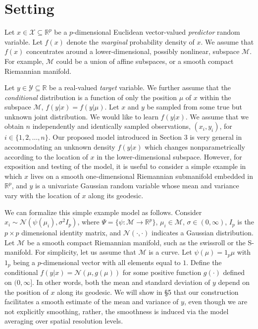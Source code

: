 \documentclass{article}
\newcommand{\Real}{\mathbb{R}}
\providecommand{\mc}[1]{\mathcal{#1}}
\newcommand{\from}{{\ensuremath{\colon}}}           %
\begin{document}
\section{Setting}
Let $x \in \mathcal{X} \subseteq \Real^p$ be a $p$-dimensional Euclidean vector-valued \emph{predictor} random variable.  Let $f(x)$ denote the \emph{marginal} probability density of $x$.  We assume that $f(x)$ concentrates around a lower-dimensional, possibly nonlinear, subspace $\mc{M}$.  For example, $\mc{M}$ could be a union of affine subspaces, or a smooth compact Riemannian manifold.  

Let $y \in  \mathcal{Y} \subseteq \Real$ be a real-valued \emph{target} variable. We further assume that the \emph{conditional} distribution is a function of only the position $\mu$ of $x$ within the subspace $\mathcal{M}$, $f(y|x)=f(y|\mu)$. Let $x$ and $y$ be sampled from some true but unknown joint distribution. We would like to learn $f(y| x)$.  We assume that we obtain $n$ independently and identically sampled observations, $(x_i,y_i) $, for $i \in \{1,2,\ldots,n\}$.  
Our proposed model introduced in Section 3 is very general in accommodating an unknown density $f(y|x)$ which changes nonparametrically according to the location of $x$ in the lower-dimensional subspace.  However, for exposition and testing of the model, it is useful to consider a simple example in which $x$ lives on a smooth one-dimensional Riemannian submanifold embedded in $\Real^p$, and  $y$ is a univariate Gaussian random variable whose mean and variance vary with the location of $x$ along its geodesic.  

We can formalize this simple example model as follows. Consider  $x_i \sim \mc{N}(\psi(\mu_i),\sigma^2 I_p)$, where $\Psi =\{ \psi \from \mc{M} \to \Real^p\}$, $\mu_i \in \mc{M}$, $\sigma \in (0,\infty)$, $I_p$ is the $p\times p$ dimensional identity matrix, and $\mc{N}(\cdot,\cdot)$ indicates a Gaussian distribution.  Let $\mc{M}$ be a smooth compact Riemannian manifold, such as the swissroll or the S-manifold. For simplicity, let us assume that $\mc{M}$ is a curve. Let $\psi(\mu)=1_p \mu$ with $1_p$ being a $p$-dimensional vector with all elements equal to $1$. Define the conditional $f(y|x) = \mc{N}( \mu, g(\mu))$ for some positive function $g(\cdot)$ defined on $(0,\infty]$. In other words, both the mean and standard deviation of $y$ depend on the position of $x$ along its geodesic. We will show in \S 5 that  our construction facilitates a smooth estimate of the mean and variance of $y$, even though we are not explicitly smoothing, rather, the smoothness is induced via the  model averaging over spatial resolution levels.
\end{document}
